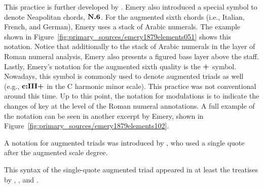 This practice is further developed by \textcite{emery1879elements}.
Emery also introduced a special symbol to denote Neapolitan chords, $\textbf{N.6}\relax\relax$.
For the augmented sixth chords (i.e., Italian, French, and German), Emery uses a stack of Arabic numerals.
The example shown in Figure~\ref{fig:primary_sources/emery1879elements051} shows this notation.
Notice that additionally to the stack of Arabic numerals in the layer of Roman numeral analysis, Emery also presents a figured bass layer above the staff.
Lastly, Emery's notation for the augmented sixth quality is the $\textbf{+}\relax\relax$ symbol.
Nowadays, this symbol is commonly used to denote augmented triads as well (e.g., $\textbf{c:III+}\relax\relax$ in the C harmonic minor scale).
This practice was not conventional around this time.
Up to this point, the notation for modulations is to indicate the changes of key at the level of the Roman numeral annotations.
A full example of the notation can be seen in another excerpt by Emery, shown in Figure~\ref{fig:primary_sources/emery1879elements102}.


A notation for augmented triads was introduced by \textcite{jadassohn1883lehrbuch}, who used a single quote after the augmented scale degree.


This syntax of the single-quote augmented triad appeared in at least the treatises by \textcite{broekhoven1889system}, \textcite{buwa1893schule}, and \textcite{shepard1896harmony}.


